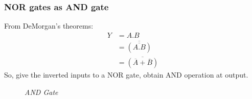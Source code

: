		\subsubsection{NOR gates as AND gate}
		From DeMorgan’s theorems:
		\begin{align*}
			Y &= A.B \\
			  &= \overline{(\overline{A.B})} \\
			  &= \overline{(\overline{A} + \overline{B})}
		\end{align*}
		So, give the inverted inputs to a NOR gate, obtain AND operation at output.
		\begin{figure}[ht]
			\centering
			\hfill
			\caption{\textit{AND Gate}}
		\end{figure}
		

